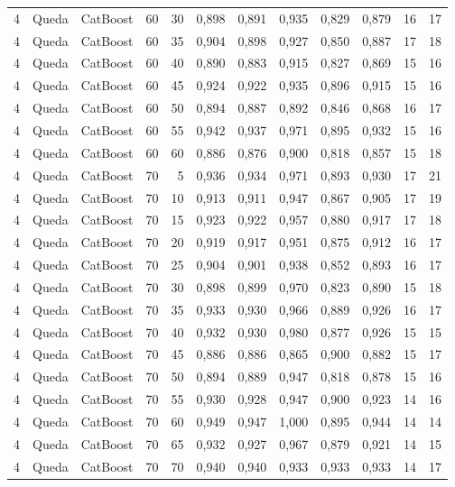 \begin{longtable}{@{}rllrrrrrrrrr@{}}
4 & Queda & CatBoost & 60 & 30 & 0,898 & 0,891 & 0,935 & 0,829 & 0,879 & 16 & 17 \\
4 & Queda & CatBoost & 60 & 35 & 0,904 & 0,898 & 0,927 & 0,850 & 0,887 & 17 & 18 \\
4 & Queda & CatBoost & 60 & 40 & 0,890 & 0,883 & 0,915 & 0,827 & 0,869 & 15 & 16 \\
4 & Queda & CatBoost & 60 & 45 & 0,924 & 0,922 & 0,935 & 0,896 & 0,915 & 15 & 16 \\
4 & Queda & CatBoost & 60 & 50 & 0,894 & 0,887 & 0,892 & 0,846 & 0,868 & 16 & 17 \\
4 & Queda & CatBoost & 60 & 55 & 0,942 & 0,937 & 0,971 & 0,895 & 0,932 & 15 & 16 \\
4 & Queda & CatBoost & 60 & 60 & 0,886 & 0,876 & 0,900 & 0,818 & 0,857 & 15 & 18 \\
4 & Queda & CatBoost & 70 & 5 & 0,936 & 0,934 & 0,971 & 0,893 & 0,930 & 17 & 21 \\
4 & Queda & CatBoost & 70 & 10 & 0,913 & 0,911 & 0,947 & 0,867 & 0,905 & 17 & 19 \\
4 & Queda & CatBoost & 70 & 15 & 0,923 & 0,922 & 0,957 & 0,880 & 0,917 & 17 & 18 \\
4 & Queda & CatBoost & 70 & 20 & 0,919 & 0,917 & 0,951 & 0,875 & 0,912 & 16 & 17 \\
4 & Queda & CatBoost & 70 & 25 & 0,904 & 0,901 & 0,938 & 0,852 & 0,893 & 16 & 17 \\
4 & Queda & CatBoost & 70 & 30 & 0,898 & 0,899 & 0,970 & 0,823 & 0,890 & 15 & 18 \\
4 & Queda & CatBoost & 70 & 35 & 0,933 & 0,930 & 0,966 & 0,889 & 0,926 & 16 & 17 \\
4 & Queda & CatBoost & 70 & 40 & 0,932 & 0,930 & 0,980 & 0,877 & 0,926 & 15 & 15 \\
4 & Queda & CatBoost & 70 & 45 & 0,886 & 0,886 & 0,865 & 0,900 & 0,882 & 15 & 17 \\
4 & Queda & CatBoost & 70 & 50 & 0,894 & 0,889 & 0,947 & 0,818 & 0,878 & 15 & 16 \\
4 & Queda & CatBoost & 70 & 55 & 0,930 & 0,928 & 0,947 & 0,900 & 0,923 & 14 & 16 \\
4 & Queda & CatBoost & 70 & 60 & 0,949 & 0,947 & 1,000 & 0,895 & 0,944 & 14 & 14 \\
4 & Queda & CatBoost & 70 & 65 & 0,932 & 0,927 & 0,967 & 0,879 & 0,921 & 14 & 15 \\
4 & Queda & CatBoost & 70 & 70 & 0,940 & 0,940 & 0,933 & 0,933 & 0,933 & 14 & 17 \\

\end{longtable}
